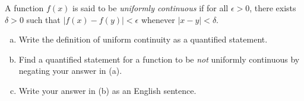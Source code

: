 \documentclass[11pt,letterpaper]{article}
\begin{document}
\newpage



 A function $f(x)$ is said to be \textit{uniformly continuous} if for all $\epsilon > 0$, there exists $\delta > 0$ such that $|f(x) - f(y)| < \epsilon$ whenever $|x - y| < \delta$. 
	\begin{enumerate}[(a)]
	\item Write the definition of uniform continuity as a quantified statement. 
	\item Find a quantified statement for a function to be \textit{not} uniformly continuous by negating your answer in (a). 
	\item Write your answer in (b) as an English sentence. 
	\end{enumerate}
\end{document}
